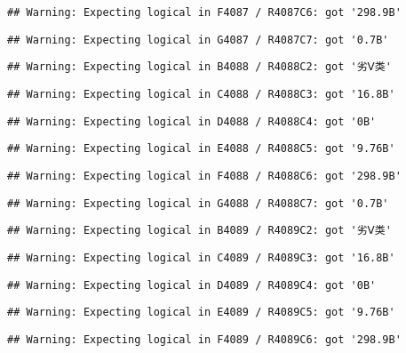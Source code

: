 \documentclass[
]{article}
\begin{document}
\begin{verbatim}
## Warning: Expecting logical in F4087 / R4087C6: got '298.9B'
\end{verbatim}

\begin{verbatim}
## Warning: Expecting logical in G4087 / R4087C7: got '0.7B'
\end{verbatim}

\begin{verbatim}
## Warning: Expecting logical in B4088 / R4088C2: got '劣Ⅴ类'
\end{verbatim}

\begin{verbatim}
## Warning: Expecting logical in C4088 / R4088C3: got '16.8B'
\end{verbatim}

\begin{verbatim}
## Warning: Expecting logical in D4088 / R4088C4: got '0B'
\end{verbatim}

\begin{verbatim}
## Warning: Expecting logical in E4088 / R4088C5: got '9.76B'
\end{verbatim}

\begin{verbatim}
## Warning: Expecting logical in F4088 / R4088C6: got '298.9B'
\end{verbatim}

\begin{verbatim}
## Warning: Expecting logical in G4088 / R4088C7: got '0.7B'
\end{verbatim}

\begin{verbatim}
## Warning: Expecting logical in B4089 / R4089C2: got '劣Ⅴ类'
\end{verbatim}

\begin{verbatim}
## Warning: Expecting logical in C4089 / R4089C3: got '16.8B'
\end{verbatim}

\begin{verbatim}
## Warning: Expecting logical in D4089 / R4089C4: got '0B'
\end{verbatim}

\begin{verbatim}
## Warning: Expecting logical in E4089 / R4089C5: got '9.76B'
\end{verbatim}

\begin{verbatim}
## Warning: Expecting logical in F4089 / R4089C6: got '298.9B'
\end{verbatim}
\end{document}

